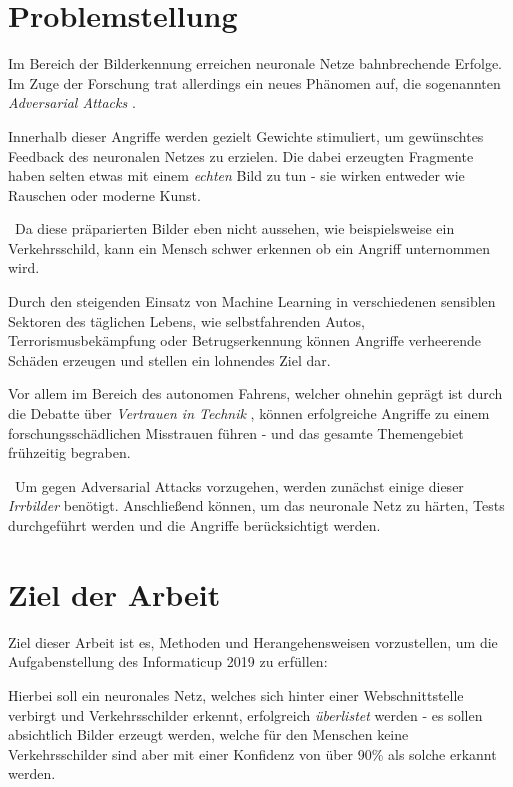 \section{Problemstellung}
Im Bereich der Bilderkennung erreichen neuronale Netze bahnbrechende Erfolge. Im Zuge der Forschung trat allerdings ein neues Phänomen auf, die sogenannten \textit{Adversarial Attacks} \cite{todo}. 

Innerhalb dieser Angriffe werden gezielt Gewichte stimuliert, um gewünschtes Feedback des neuronalen Netzes zu erzielen. Die dabei erzeugten Fragmente haben selten etwas mit einem \textit{echten} Bild zu tun - sie wirken entweder wie Rauschen oder moderne Kunst. 

~\newline Da diese präparierten Bilder eben nicht aussehen, wie beispielsweise ein Verkehrsschild, kann ein Mensch schwer erkennen ob ein Angriff unternommen wird. 

Durch den steigenden Einsatz von Machine Learning in verschiedenen sensiblen Sektoren des täglichen Lebens, wie selbstfahrenden Autos, Terrorismusbekämpfung oder Betrugserkennung können Angriffe verheerende Schäden erzeugen und stellen ein lohnendes Ziel dar. 

Vor allem im Bereich des autonomen Fahrens, welcher ohnehin geprägt ist durch die Debatte über \textit{Vertrauen in Technik} \cite{todo}, können erfolgreiche Angriffe zu einem forschungsschädlichen Misstrauen führen - und das gesamte Themengebiet frühzeitig begraben. 

~\newline Um gegen Adversarial Attacks vorzugehen, werden zunächst einige dieser \textit{Irrbilder} benötigt. Anschließend können, um das neuronale Netz zu härten, Tests durchgeführt werden und die Angriffe berücksichtigt werden. 


\section{Ziel der Arbeit}
\label{sec:ZielDerArbeit}
Ziel dieser Arbeit ist es, Methoden und Herangehensweisen vorzustellen, um die Aufgabenstellung des Informaticup 2019  zu erfüllen: 

Hierbei soll ein neuronales Netz, welches sich hinter einer Webschnittstelle verbirgt und Verkehrsschilder erkennt, erfolgreich \textit{überlistet} werden - es sollen absichtlich Bilder erzeugt werden, welche für den Menschen keine Verkehrsschilder sind aber mit einer Konfidenz von über 90\% als solche erkannt werden. 

